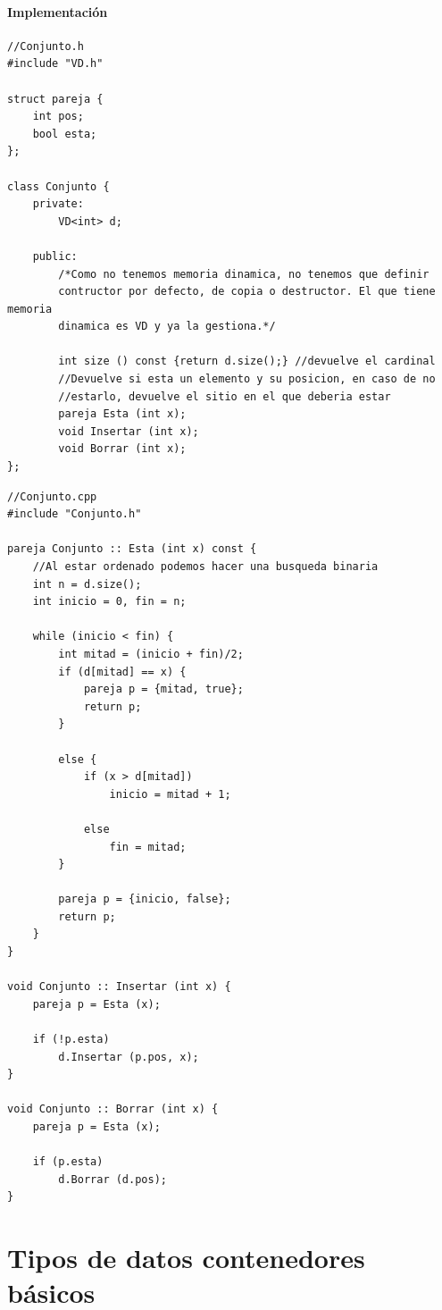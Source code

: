 \documentclass[10pt,a4paper,spanish]{report}
\begin{document}
\subsubsection{\textcolor[rgb]{0.8,0.2,0.2}Implementación}
\begin{verbatim}
//Conjunto.h
#include "VD.h"

struct pareja {
    int pos;
    bool esta;
};

class Conjunto {
    private:
        VD<int> d;

    public:
        /*Como no tenemos memoria dinamica, no tenemos que definir
        contructor por defecto, de copia o destructor. El que tiene memoria
        dinamica es VD y ya la gestiona.*/

        int size () const {return d.size();} //devuelve el cardinal
        //Devuelve si esta un elemento y su posicion, en caso de no
        //estarlo, devuelve el sitio en el que deberia estar
        pareja Esta (int x);
        void Insertar (int x);
        void Borrar (int x);
};
\end{verbatim}

\begin{verbatim}
//Conjunto.cpp
#include "Conjunto.h"

pareja Conjunto :: Esta (int x) const {
    //Al estar ordenado podemos hacer una busqueda binaria
    int n = d.size();
    int inicio = 0, fin = n;

    while (inicio < fin) {
        int mitad = (inicio + fin)/2;
        if (d[mitad] == x) {
            pareja p = {mitad, true};
            return p;
        }

        else {
            if (x > d[mitad])
                inicio = mitad + 1;

            else
                fin = mitad;
        }

        pareja p = {inicio, false};
        return p;
    }
}

void Conjunto :: Insertar (int x) {
    pareja p = Esta (x);

    if (!p.esta)
        d.Insertar (p.pos, x);
}

void Conjunto :: Borrar (int x) {
    pareja p = Esta (x);

    if (p.esta)
        d.Borrar (d.pos);
}
\end{verbatim}

\chapter{\textcolor[rgb]{0.2,0.5,0.5}{Tipos de datos contenedores básicos}}
\end{document}
